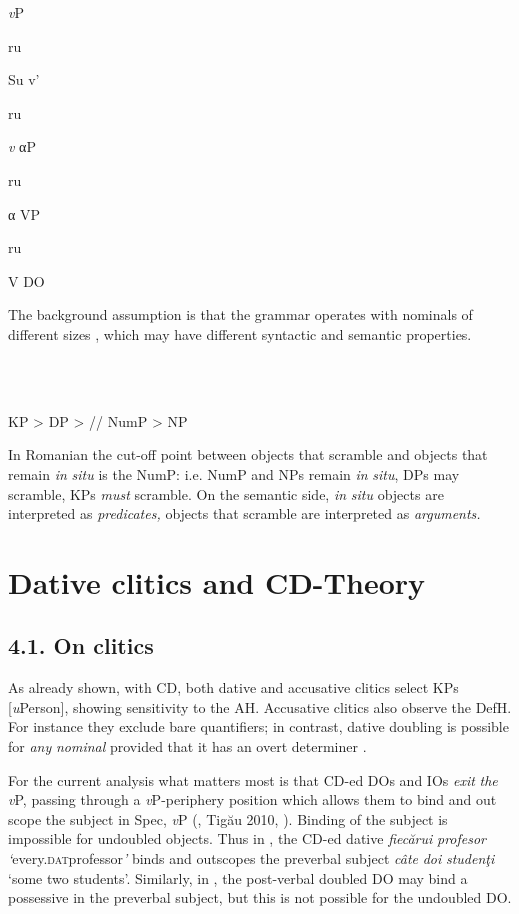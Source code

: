 \documentclass[output=paper,colorlinks,citecolor=brown]{./langscibook}
\begin{document}
     \textit{v}P

  ru

  Su    v’

      ru

    \textit{v}    αP

      ru

      α    VP

            ru

            V    DO

The background assumption is that the grammar operates with nominals of different sizes , which may have different syntactic and semantic properties. 

\ea%
    \label{ex:key:26}
    \gll\\
        \\
    \glt
    \z

          KP  >  DP  >  //  NumP  > NP

In Romanian the cut-off point between objects that scramble and objects that remain \textit{in} \textit{situ} is the NumP: i.e. NumP and NPs remain \textit{in} \textit{situ}, DPs may scramble, KPs \textit{must} scramble. On the semantic side, \textit{in} \textit{situ} objects are interpreted as \textit{predicates,} objects that scramble are interpreted as \textit{arguments.}

\section{Dative clitics and CD-Theory} %

\subsection{\textbf{4.1.} \textbf{On} \textbf{clitics}}

As already shown, with CD, both dative and accusative clitics select KPs [\textit{u}Person], showing sensitivity to the AH. Accusative clitics also observe the DefH. For instance they exclude bare quantifiers; in contrast, dative doubling is possible for \textit{any} \textit{nominal} provided that it has an overt determiner \citep{Cornilescu2017}.

For the current analysis what matters most is that CD-ed DOs and IOs \textit{exit} \textit{the} \textit{v}P, passing through a \textit{v}P-periphery position which allows them to bind and out scope the subject in Spec, \textit{v}P (\citealt{Dobrovie-Sorin1994}, Tigău 2010, \citealt{CornilescuDinuTigău2017Dative}). Binding of the subject is impossible for undoubled objects. Thus in , the CD-ed dative \textit{fiecărui} \textit{profesor} \textit{‘}every.\textsc{dat}professor\textit{’} binds and outscopes the preverbal subject \textit{câte} \textit{doi} \textit{studenţi} ‘some two students’. Similarly, in , the post-verbal doubled DO may bind a possessive in the preverbal subject, but this is not possible for the undoubled DO. 
\end{document}
